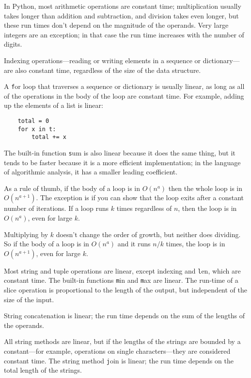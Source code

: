 \documentclass[
DIV=11,
fontsize=13,
twoside,
headinclude=false,
titlepage=firstiscover,
abstract=true,
headsepline=true,
footsepline=true,
chapterprefix=true, %
headings=big,
bibliography=totoc,%
captions=tableheading
]{scrbook}
\theoremstyle{definition}
\begin{document}
In Python, most arithmetic operations are constant time;
multiplication usually takes longer than addition and subtraction, and
division takes even longer, but these run times don't depend on the
magnitude of the operands.  Very large integers are an exception; in
that case the run time increases with the number of digits.

Indexing operations---reading or writing elements in a sequence
or dictionary---are also constant time, regardless of the size
of the data structure.

A {\texttt for} loop that traverses a sequence or dictionary is
usually linear, as long as all of the operations in the body
of the loop are constant time.  For example, adding up the
elements of a list is linear:

\begin{lstlisting}
    total = 0
    for x in t:
        total += x
\end{lstlisting}

The built-in function {\texttt sum} is also linear because it does
the same thing, but it tends to be faster because it is a more
efficient implementation; in the language of algorithmic analysis,
it has a smaller leading coefficient.

As a rule of thumb, if the body of a loop is in $O(n^a)$ then
the whole loop is in $O(n^{a+1})$.  The exception is if you can
show that the loop exits after a constant number of iterations.
If a loop runs $k$ times regardless of $n$, then
the loop is in $O(n^a)$, even for large $k$.

Multiplying by $k$ doesn't change the order of growth, but neither
does dividing.  So if the body of a loop is in $O(n^a)$ and it runs
$n/k$ times, the loop is in $O(n^{a+1})$, even for large $k$.

Most string and tuple operations are linear, except indexing and {\texttt
  len}, which are constant time.  The built-in functions {\texttt min} and
{\texttt max} are linear.  The run-time of a slice operation is
proportional to the length of the output, but independent of the size
of the input.

String concatenation is linear; the run time depends on the sum
of the lengths of the operands.

All string methods are linear, but if the lengths of
the strings are bounded by a constant---for example, operations on single
characters---they are considered constant time.
The string method {\texttt join} is linear; the run time depends on
the total length of the strings.
\end{document}
